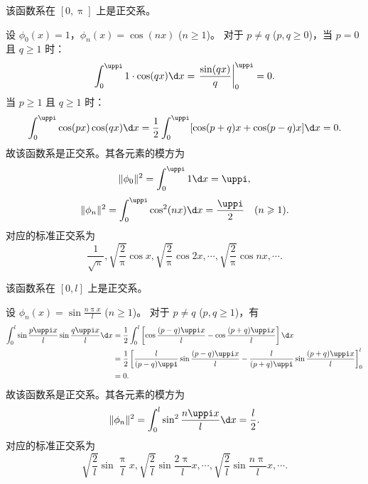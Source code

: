 \begin{myproof}
    该函数系在 $[0, \uppi]$ 上是正交系。

    设 $\phi_0(x) = 1$，$\phi_n(x) = \cos(nx)$ ($n \geqslant 1$)。
    对于 $p \neq q$ ($p, q \geqslant 0$)，当 $p=0$ 且 $q \geqslant 1$ 时：
    \begin{equation}\label{eq:orth-1-1}
        \int_{0}^{\uppi} 1 \cdot \cos(qx) \d x = \left. \frac{\sin(qx)}{q} \right|_{0}^{\uppi} = 0.
    \end{equation}
    当 $p \geqslant 1$ 且 $q \geqslant 1$ 时：
    \begin{equation}\label{eq:orth-1-2}
        \int_{0}^{\uppi} \cos(px) \cos(qx) \d x = \frac{1}{2} \int_{0}^{\uppi} [\cos(p+q)x + \cos(p-q)x] \d x = 0.
    \end{equation}
    故该函数系是正交系。其各元素的模方为
    \begin{equation}\label{eq:norm-1-1}
        \|\phi_0\|^2 = \int_{0}^{\uppi} 1 \d x = \uppi,
    \end{equation}
    \begin{equation}\label{eq:norm-1-2}
        \|\phi_n\|^2 = \int_{0}^{\uppi} \cos^2(nx) \d x = \frac{\uppi}{2} \quad (n \geqslant 1).
    \end{equation}
    对应的标准正交系为
    \begin{equation}
        \boxed{\frac{1}{\sqrt{\uppi}}, \sqrt{\frac{2}{\uppi}}\cos x, \sqrt{\frac{2}{\uppi}}\cos 2x, \cdots, \sqrt{\frac{2}{\uppi}}\cos nx, \cdots}.
    \end{equation}

    该函数系在 $[0, l]$ 上是正交系。

    设 $\phi_n(x) = \sin \frac{n\uppi x}{l}$ ($n \geqslant 1$)。
    对于 $p \neq q$ ($p, q \geqslant 1$)，有
    \begin{equation}\label{eq:orth-2-1}
        \begin{aligned}
            \int_{0}^{l} \sin \frac{p\uppi x}{l} \sin \frac{q\uppi x}{l} \d x & = \frac{1}{2} \int_{0}^{l} \left[ \cos \frac{(p-q)\uppi x}{l} - \cos \frac{(p+q)\uppi x}{l} \right] \d x                                 \\
                                                                              & = \frac{1}{2} \left[ \frac{l}{(p-q)\uppi} \sin \frac{(p-q)\uppi x}{l} - \frac{l}{(p+q)\uppi} \sin \frac{(p+q)\uppi x}{l} \right]_{0}^{l} \\
                                                                              & = 0.
        \end{aligned}
    \end{equation}
    故该函数系是正交系。其各元素的模方为
    \begin{equation}\label{eq:norm-2}
        \|\phi_n\|^2 = \int_{0}^{l} \sin^2 \frac{n\uppi x}{l} \d x = \frac{l}{2}.
    \end{equation}
    对应的标准正交系为
    \begin{equation}
        \boxed{\sqrt{\frac{2}{l}}\sin \frac{\uppi}{l}x, \sqrt{\frac{2}{l}}\sin \frac{2\uppi}{l}x, \cdots, \sqrt{\frac{2}{l}}\sin \frac{n\uppi}{l}x, \cdots}.
    \end{equation}


\end{myproof}
